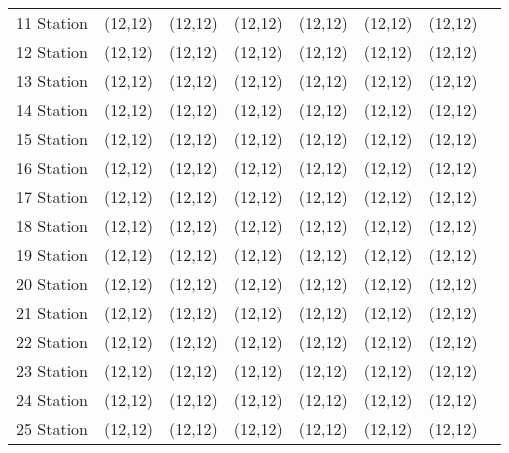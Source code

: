 \documentclass{article}
\begin{document}
\begin{multicols*}{2}
\begin {minipage}{\linewidth}
\begin{supertabular}{c*{6}{>{\centering\arraybackslash}p{1em}}c@{}}
		11 Station  & \framebox(12,12){} & \framebox(12,12){} & \framebox(12,12){} & \framebox(12,12){} & \framebox(12,12){} & \framebox(12,12){} &\\
		12 Station  & \framebox(12,12){} & \framebox(12,12){} & \framebox(12,12){} & \framebox(12,12){} & \framebox(12,12){} & \framebox(12,12){} &\\
		13 Station  & \framebox(12,12){} & \framebox(12,12){} & \framebox(12,12){} & \framebox(12,12){} & \framebox(12,12){} & \framebox(12,12){} &\\
		14 Station  & \framebox(12,12){} & \framebox(12,12){} & \framebox(12,12){} & \framebox(12,12){} & \framebox(12,12){} & \framebox(12,12){} &\\
		15 Station  & \framebox(12,12){} & \framebox(12,12){} & \framebox(12,12){} & \framebox(12,12){} & \framebox(12,12){} & \framebox(12,12){} &\\
		16 Station  & \framebox(12,12){} & \framebox(12,12){} & \framebox(12,12){} & \framebox(12,12){} & \framebox(12,12){} & \framebox(12,12){} &\\
		17 Station  & \framebox(12,12){} & \framebox(12,12){} & \framebox(12,12){} & \framebox(12,12){} & \framebox(12,12){} & \framebox(12,12){} &\\
		18 Station  & \framebox(12,12){} & \framebox(12,12){} & \framebox(12,12){} & \framebox(12,12){} & \framebox(12,12){} & \framebox(12,12){} &\\
		19 Station  & \framebox(12,12){} & \framebox(12,12){} & \framebox(12,12){} & \framebox(12,12){} & \framebox(12,12){} & \framebox(12,12){} &\\
		20 Station  & \framebox(12,12){} & \framebox(12,12){} & \framebox(12,12){} & \framebox(12,12){} & \framebox(12,12){} & \framebox(12,12){} &\\
		21 Station  & \framebox(12,12){} & \framebox(12,12){} & \framebox(12,12){} & \framebox(12,12){} & \framebox(12,12){} & \framebox(12,12){} &\\
		22 Station  & \framebox(12,12){} & \framebox(12,12){} & \framebox(12,12){} & \framebox(12,12){} & \framebox(12,12){} & \framebox(12,12){} &\\
		23 Station  & \framebox(12,12){} & \framebox(12,12){} & \framebox(12,12){} & \framebox(12,12){} & \framebox(12,12){} & \framebox(12,12){} &\\
		24 Station  & \framebox(12,12){} & \framebox(12,12){} & \framebox(12,12){} & \framebox(12,12){} & \framebox(12,12){} & \framebox(12,12){} &\\
		25 Station  & \framebox(12,12){} & \framebox(12,12){} & \framebox(12,12){} & \framebox(12,12){} & \framebox(12,12){} & \framebox(12,12){} &\\

\end{supertabular}
\end{minipage}
\end{multicols*}
\end{document}
